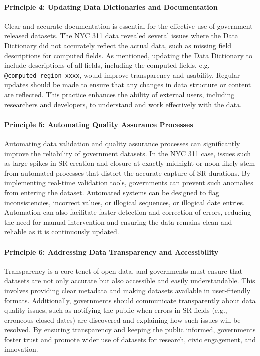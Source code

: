 \documentclass[linenumber]{jdsart}
\begin{document}
\paragraph{Principle 4: Updating Data Dictionaries and Documentation}
Clear and accurate documentation is essential for the effective use 
of government-released datasets. The NYC 311 data revealed several 
issues where the Data Dictionary did not accurately reflect the 
actual data, such as missing field descriptions for computed fields. 
As mentioned, updating the Data Dictionary to include descriptions of all fields, 
including the computed fields, e.g. \texttt{@computed\_region\_xxxx}, 
would improve transparency and usability. Regular updates should 
be made to ensure that any changes in data structure or content are 
reflected. This practice enhances the ability of external users, 
including researchers and developers, to understand and work 
effectively with the data.

\paragraph{Principle 5: Automating Quality Assurance Processes}
Automating data validation and quality assurance processes can 
significantly improve the reliability of government datasets. In the 
NYC 311 case, issues such as large spikes in SR creation and closure 
at exactly midnight or noon likely stem from automated processes that 
distort the accurate capture of SR durations. By implementing 
real-time validation tools, governments can prevent such anomalies 
from entering the dataset. Automated systems can be designed to 
flag inconsistencies, incorrect values, or illogical sequences, or 
illogical date entries. 
Automation can also facilitate faster detection and correction of 
errors, reducing the need for manual intervention and ensuring 
the data remains clean and reliable as it is continuously updated.

\paragraph{Principle 6: Addressing Data Transparency and Accessibility}
Transparency is a core tenet of open data, and governments must ensure 
that datasets are not only accurate but also accessible and easily 
understandable. This involves providing clear metadata and making 
datasets available in user-friendly formats. Additionally, 
governments should communicate transparently about 
data quality issues, such as notifying the public when errors in SR 
fields (e.g., erroneous closed dates) are discovered and explaining 
how such issues will be resolved. By ensuring transparency and 
keeping the public informed, governments foster trust and promote 
wider use of datasets for research, civic engagement, and innovation.
\end{document}
